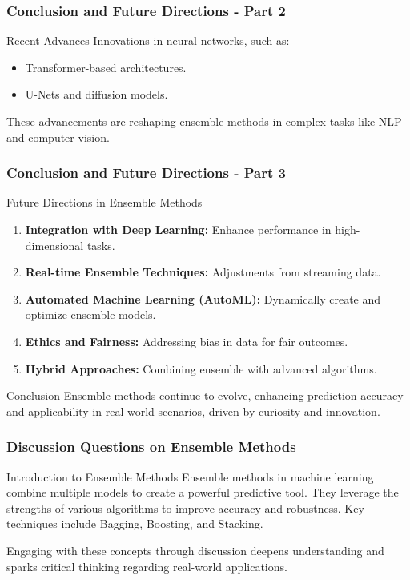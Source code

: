\documentclass[aspectratio=169]{beamer}
\begin{document}
\begin{frame}[fragile]
    \frametitle{Conclusion and Future Directions - Part 2}
    \begin{block}{Recent Advances}
        Innovations in neural networks, such as:
        \begin{itemize}
            \item Transformer-based architectures.
            \item U-Nets and diffusion models.
        \end{itemize}
        These advancements are reshaping ensemble methods in complex tasks like NLP and computer vision.
    \end{block}
\end{frame}

\begin{frame}[fragile]
    \frametitle{Conclusion and Future Directions - Part 3}
    \begin{block}{Future Directions in Ensemble Methods}
        \begin{enumerate}
            \item \textbf{Integration with Deep Learning:} Enhance performance in high-dimensional tasks.
            \item \textbf{Real-time Ensemble Techniques:} Adjustments from streaming data.
            \item \textbf{Automated Machine Learning (AutoML):} Dynamically create and optimize ensemble models.
            \item \textbf{Ethics and Fairness:} Addressing bias in data for fair outcomes.
            \item \textbf{Hybrid Approaches:} Combining ensemble with advanced algorithms.
        \end{enumerate}
    \end{block}
    
    \begin{block}{Conclusion}
        Ensemble methods continue to evolve, enhancing prediction accuracy and applicability in real-world scenarios, driven by curiosity and innovation.
    \end{block}
\end{frame}

\begin{frame}[fragile]
    \frametitle{Discussion Questions on Ensemble Methods}
    \begin{block}{Introduction to Ensemble Methods}
        Ensemble methods in machine learning combine multiple models to create a powerful predictive tool. They leverage the strengths of various algorithms to improve accuracy and robustness. Key techniques include Bagging, Boosting, and Stacking.
    \end{block}
    Engaging with these concepts through discussion deepens understanding and sparks critical thinking regarding real-world applications.
\end{frame}
\end{document}
